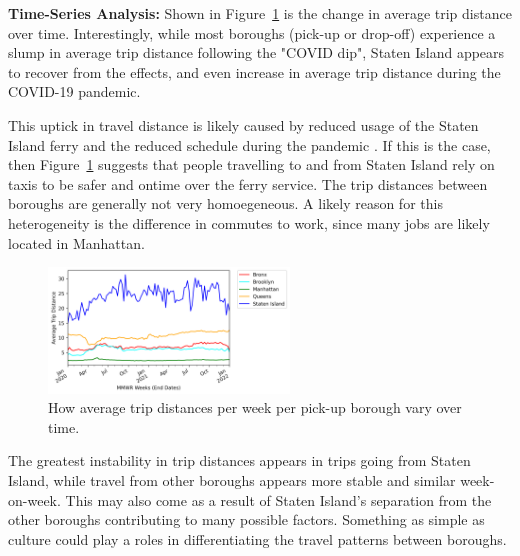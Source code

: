 \documentclass[11pt]{article}
\begin{document}
\begin{multicols}{2}

    \textbf{Time-Series Analysis:}
    Shown in Figure~\ref{fig:ts} is the change in average trip distance over time. Interestingly, 
    while most boroughs (pick-up or drop-off) experience a slump in average trip distance following the "COVID dip", 
    Staten Island appears to recover from the effects, and even increase in average trip distance
    during the COVID-19 pandemic.

This uptick in travel distance is likely caused by reduced usage of the Staten Island ferry and the reduced schedule during the pandemic \cite{dot2020}.
If this is the case, then Figure~\ref{fig:ts} suggests that people travelling to and from Staten Island rely on taxis to be safer and ontime over the ferry service.
The trip distances between boroughs are generally not very homoegeneous. 
A likely reason for this heterogeneity is the difference in commutes to work, since
many jobs are likely located in Manhattan.

\begin{figure}[H]

    \centering

    \includegraphics[width=0.57\textwidth]{../plots/time-series-Average Trip Distance-vs-MMWR Weeks (End Dates)-by-pu_borough.png}
    \caption{How average trip distances per week per pick-up borough vary over time.} %

    \label{fig:ts}
\end{figure}
\end{multicols}

The greatest instability in trip distances appears in trips going from Staten Island,
while travel from other boroughs appears more stable and similar week-on-week. 
This may also come as a result of Staten Island's separation from the other boroughs
contributing to many possible factors.
Something as simple as culture could play a roles in differentiating the travel patterns between boroughs.
\end{document}
